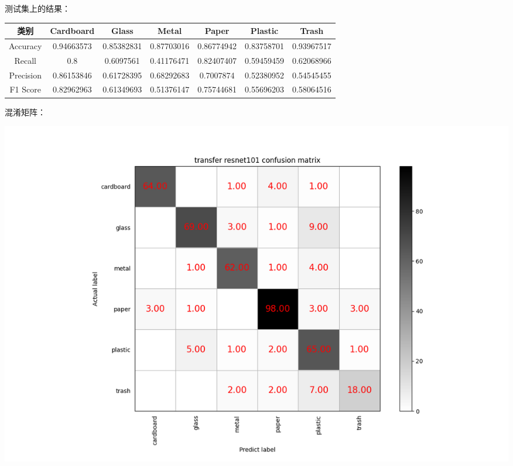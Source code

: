 \documentclass[UTF8]{ctexart}
\begin{document}
测试集上的结果：

\begin{tabular}{|c|c|c|c|c|c|c|}
\hline 
类别 & Cardboard & Glass & Metal & Paper & Plastic & Trash \\ 
\hline 
Accuracy &0.94663573 &0.85382831 &0.87703016& 0.86774942& 0.83758701& 0.93967517\\
 \hline 
Recall &0.8      &  0.6097561 & 0.41176471& 0.82407407& 0.59459459& 0.62068966\\ 
\hline 
Precision &0.86153846& 0.61728395& 0.68292683& 0.7007874 & 0.52380952& 0.54545455\\ 
\hline 
F1 Score &0.82962963 &0.61349693 &0.51376147& 0.75744681& 0.55696203& 0.58064516\\ 
\hline 
\end{tabular}

混淆矩阵：

\includegraphics[scale=0.5]{cm/res101.png} 
\end{document}
